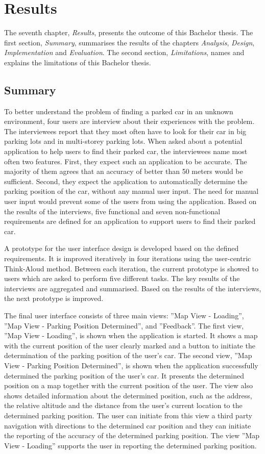 \chapter{Results}
The seventh chapter, \textit{Results}, presents the outcome of this Bachelor thesis. The first section, \textit{Summary}, summarises the results of the chapters \textit{Analysis}, \textit{Design}, \textit{Implementation} and \textit{Evaluation}. The second section, \textit{Limitations}, names and explains the limitations of this Bachelor thesis. 

\section{Summary}
To better understand the problem of finding a parked car in an unknown environment, four users are interview about their experiences with the problem. The interviewees report that they most often have to look for their car in big parking lots and in multi-storey parking lots. When asked about a potential application to help users to find their parked car, the interviewees name most often two features. First, they expect such an application to be accurate. The majority of them agrees that an accuracy of better than 50 meters would be sufficient. Second, they expect the application to automatically determine the parking position of the car, without any manual user input. The need for manual user input would prevent some of the users from using the application. Based on the results of the interviews, five functional and seven non-functional requirements are defined for an application to support users to find their parked car.

A prototype for the user interface design is developed based on the defined requirements. It is improved iteratively in four iterations using the user-centric Think-Aloud method. Between each iteration, the current prototype is showed to users which are asked to perform five different tasks. The key results of the interviews are aggregated and summarised. Based on the results of the interviews, the next prototype is improved. 

The final user interface consists of three main views: ''Map View - Loading'', ''Map View - Parking Position Determined'', and ''Feedback''. The first view, ''Map View - Loading'', is shown when the application is started. It shows a map with the current position of the user clearly marked and a button to initiate the determination of the parking position of the user's car. The second view, ''Map View - Parking Position Determined'', is shown when the application successfully determined the parking position of the user's car. It presents the determined position on a map together with the current position of the user. The view also shows detailed information about the determined position, such as the address, the relative altitude and the distance from the user's current location to the determined parking position. The user can initiate from this view a third party navigation with directions to the determined car position and they can initiate the reporting of the accuracy of the determined parking position. The view ''Map View - Loading'' supports the user in reporting the determined parking position.

